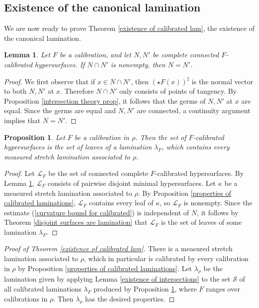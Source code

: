 \documentclass[reqno,11pt]{amsart}
\newtheorem{lemma}[theorem]{Lemma}
\newtheorem{proposition}[theorem]{Proposition}
\theoremstyle{definition}
\numberwithin{equation}{section}
\begin{document}
\subsection{Existence of the canonical lamination}
We are now ready to prove Theorem \ref{existence of calibrated lam}, the existence of the canonical lamination.

\begin{lemma}\label{calibrated implies disjoint}
Let $F$ be a calibration, and let $N, N'$ be complete connected $F$-calibrated hypersurfaces.
If $N \cap N'$ is nonempty, then $N = N'$.
\end{lemma}
\begin{proof}
We first observe that if $x \in N \cap N'$, then $(\star F(x))^\sharp$ is the normal vector to both $N, N'$ at $x$.
Therefore $N \cap N'$ only consists of points of tangency.
By Proposition \ref{intersection theory prop}, it follows that the germs of $N, N'$ at $x$ are equal.
Since the germs are equal and $N, N'$ are connected, a continuity argument implies that $N = N'$.
\end{proof}

\begin{proposition}\label{existence of semicanonical lamination}
Let $F$ be a calibration in $\rho$.
Then the set of $F$-calibrated hypersurfaces is the set of leaves of a lamination $\lambda_F$, which contains every measured stretch lamination associated to $\rho$.
\end{proposition}
\begin{proof}
Let $\mathscr L_F$ be the set of connected complete $F$-calibrated hypersurfaces.
By Lemma \ref{calibrated implies disjoint}, $\mathscr L_F$ consists of pairwise disjoint minimal hypersurfaces.
Let $\kappa$ be a measured stretch lamination associated to $\rho$.
By Proposition \ref{properties of calibrated laminations}, $\mathscr L_F$ contains every leaf of $\kappa$, so $\mathscr L_F$ is nonempty.
Since the estimate (\ref{curvature bound for calibrated}) is independent of $N$, it follows by Theorem \ref{disjoint surfaces are lamination} that $\mathscr L_F$ is the set of leaves of some lamination $\lambda_F$.
\end{proof}

\begin{proof}[Proof of Theorem \ref{existence of calibrated lam}]
There is a measured stretch lamination associated to $\rho$, which in particular is calibrated by every calibration in $\rho$ by Proposition \ref{properties of calibrated laminations}.
Let $\lambda_\rho$ be the lamination given by applying Lemma \ref{existence of intersections} to the set $\mathscr S$ of all calibrated laminations $\lambda_F$ produced by Proposition \ref{existence of semicanonical lamination}, where $F$ ranges over calibrations in $\rho$.
Then $\lambda_\rho$ has the desired properties.
\end{proof}
\end{document}
